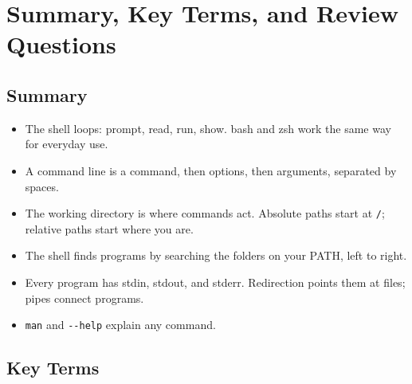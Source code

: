 \section{Summary, Key Terms, and Review Questions}\label{02-the-shell-talking-to-your-computer-in-words:summary-key-terms-and-review-questions}

\subsection*{Summary}\label{02-the-shell-talking-to-your-computer-in-words:summary}

\begin{itemize}
\tightlist
\item
  The shell loops: prompt, read, run, show. bash and zsh work the same way for everyday use.
\item
  A command line is a command, then options, then arguments, separated by spaces.
\item
  The working directory is where commands act. Absolute paths start at \texttt{/}; relative paths start where you are.
\item
  The shell finds programs by searching the folders on your PATH, left to right.
\item
  Every program has stdin, stdout, and stderr. Redirection points them at files; pipes connect programs.
\item
  \texttt{man} and \texttt{-\/-help} explain any command.
\end{itemize}


\subsection*{Key Terms}\label{02-the-shell-talking-to-your-computer-in-words:key-terms}

